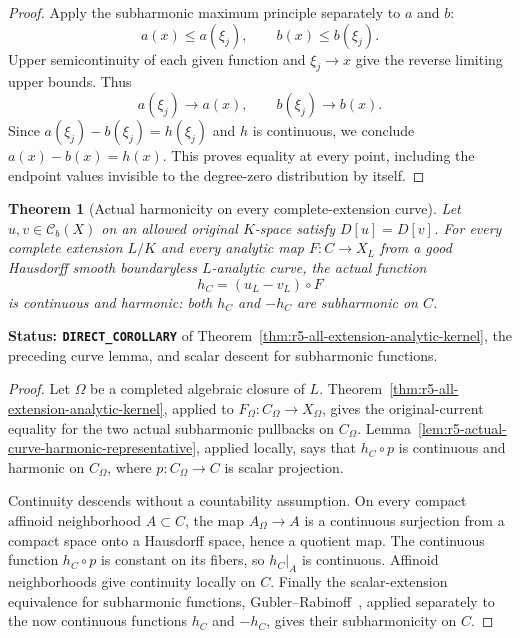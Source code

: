 \documentclass[11pt,a4paper]{article}
\numberwithin{equation}{section}
\newtheorem{theorem}{Theorem}[section]
\theoremstyle{definition}
\theoremstyle{remark}
\begin{document}
\begin{proof}
Apply the subharmonic maximum principle separately to $a$ and $b$:
\[
                  a(x)\leq a(\xi_j),\qquad
                  b(x)\leq b(\xi_j).
\]
Upper semicontinuity of each given function and $\xi_j\to x$
give the reverse limiting upper bounds.  Thus
\[
            a(\xi_j)\to a(x),\qquad b(\xi_j)\to b(x).
\]
Since $a(\xi_j)-b(\xi_j)=h(\xi_j)$ and $h$ is continuous,
we conclude $a(x)-b(x)=h(x)$.  This proves equality at every point,
including the endpoint values invisible to the degree-zero
distribution by itself.
\end{proof}

\begin{theorem}[Actual harmonicity on every complete-extension curve]
\label{thm:r5-all-extension-curve-harmonicity}
Let $u,v\in\mathcal C_b(X)$ on an allowed original $K$-space
satisfy $D[u]=D[v]$.  For every complete extension $L/K$ and every
analytic map $F:C\to X_L$ from a good Hausdorff smooth boundaryless
$L$-analytic curve, the actual function
\[
                         h_C=(u_L-v_L)\circ F
\]
is continuous and harmonic: both $h_C$ and $-h_C$ are subharmonic
on $C$.
\end{theorem}

\noindent\textbf{Status: \texttt{DIRECT\_COROLLARY}} of
Theorem~\ref{thm:r5-all-extension-analytic-kernel}, the preceding
curve lemma, and scalar descent for subharmonic functions.

\begin{proof}
Let $\Omega$ be a completed algebraic closure of $L$.
Theorem~\ref{thm:r5-all-extension-analytic-kernel}, applied to
$F_\Omega:C_\Omega\to X_\Omega$, gives the original-current
equality for the two actual subharmonic pullbacks on $C_\Omega$.
Lemma~\ref{lem:r5-actual-curve-harmonic-representative}, applied
locally, says that $h_C\circ p$ is continuous and harmonic on
$C_\Omega$, where $p:C_\Omega\to C$ is scalar projection.

Continuity descends without a countability assumption.  On every
compact affinoid neighborhood $A\subset C$, the map
$A_\Omega\to A$ is a continuous surjection from a compact space
onto a Hausdorff space, hence a quotient map.  The continuous
function $h_C\circ p$ is constant on its fibers, so $h_C|_A$ is
continuous.  Affinoid neighborhoods give continuity locally on
$C$.  Finally the scalar-extension equivalence for subharmonic
functions, Gubler--Rabinoff~\cite[Proposition~3.5(7)]{GR25},
applied separately to the now continuous functions $h_C$ and
$-h_C$, gives their subharmonicity on $C$.
\end{proof}
\end{document}
